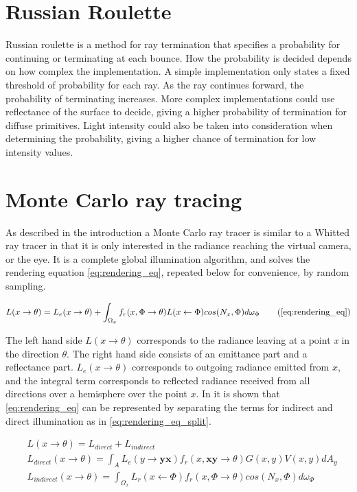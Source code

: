 \documentclass[a4paper, 12pt]{report}
\begin{document}
\section{Russian Roulette}
Russian roulette is a method for ray termination that specifies a probability for continuing or terminating at each bounce. 
How the probability is decided depends on how complex the implementation.
A simple implementation only states a fixed threshold of probability for each ray.
As the ray continues forward, the probability of terminating increases.
More complex implementations could use reflectance of the surface to decide, giving a higher probability of termination for diffuse primitives.
Light intensity could also be taken into consideration when determining the probability, giving a higher chance of termination for low intensity values.

\section{Monte Carlo ray tracing}
As described in the introduction a Monte Carlo ray tracer is similar to a Whitted ray tracer in that it is only interested in the radiance reaching the virtual camera, or the eye.
It is a complete global illumination algorithm, and solves the rendering equation \autoref{eq:rendering_eq}, repeated below for convenience, by random sampling.

\begin{equation}
L(x \rightarrow \theta) = L_e(x \rightarrow \theta) + \int_{\Omega_x} f_r(x, \Phi \rightarrow \theta)L(x \leftarrow \Phi)cos(N_x, \Phi)d\omega_{\Phi}
\tag{\ref{eq:rendering_eq}}
\end{equation}

The left hand side $L(x \rightarrow \theta)$ corresponds to the radiance leaving at a point \emph{x} in the direction $\theta$.
The right hand side consists of an emittance part and a reflectance part.
$ L_e(x \rightarrow \theta)$ corresponds to outgoing radiance emitted from $x$, and the integral term corresponds to reflected radiance received from all directions over a hemisphere over the point $x$.
In \cite{dutre} it is shown that \autoref{eq:rendering_eq} can be represented by separating the terms for indirect and direct illumination as in \autoref{eq:rendering_eq_split}.


\begin{subequations} \label{eq:rendering_eq_split}
\begin{align} 
&L(x \rightarrow \theta) = L_{direct}+L_{indirect} \\
&L_{direct}(x \rightarrow \theta) = \int_A L_e(y \rightarrow \mathbf{yx})f_r(x, \mathbf{xy}\rightarrow \theta)G(x,y)V(x,y)dA_y \\
&L_{indirect}(x \rightarrow \theta) = \int_{\Omega_x} L_r(x \leftarrow \Phi) f_r(x, \Phi \rightarrow \theta)cos(N_x, \Phi)d\omega_{\Phi}
\end{align}
\end{subequations}
\end{document}
